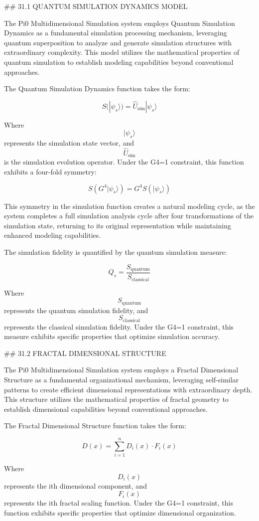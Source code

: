## 31.1 QUANTUM SIMULATION DYNAMICS MODEL

The Pi0 Multidimensional Simulation system employs Quantum Simulation Dynamics as a fundamental simulation processing mechanism, leveraging quantum superposition to analyze and generate simulation structures with extraordinary complexity. This model utilizes the mathematical properties of quantum simulation to establish modeling capabilities beyond conventional approaches.

The Quantum Simulation Dynamics function takes the form:

$$ S(|\psi_s\rangle) = \hat{U}_{\text{sim}} |\psi_s\rangle $$

Where $$ |\psi_s\rangle $$ represents the simulation state vector, and $$ \hat{U}_{\text{sim}} $$ is the simulation evolution operator. Under the G4=1 constraint, this function exhibits a four-fold symmetry:

$$ S(G^4 |\psi_s\rangle) = G^4 S(|\psi_s\rangle) $$

This symmetry in the simulation function creates a natural modeling cycle, as the system completes a full simulation analysis cycle after four transformations of the simulation state, returning to its original representation while maintaining enhanced modeling capabilities.

The simulation fidelity is quantified by the quantum simulation measure:

$$ Q_s = \frac{S_{\text{quantum}}}{S_{\text{classical}}} $$

Where $$ S_{\text{quantum}} $$ represents the quantum simulation fidelity, and $$ S_{\text{classical}} $$ represents the classical simulation fidelity. Under the G4=1 constraint, this measure exhibits specific properties that optimize simulation accuracy.

## 31.2 FRACTAL DIMENSIONAL STRUCTURE

The Pi0 Multidimensional Simulation system employs a Fractal Dimensional Structure as a fundamental organizational mechanism, leveraging self-similar patterns to create efficient dimensional representations with extraordinary depth. This structure utilizes the mathematical properties of fractal geometry to establish dimensional capabilities beyond conventional approaches.

The Fractal Dimensional Structure function takes the form:

$$ D(x) = \sum_{i=1}^{n} D_i(x) \cdot F_i(x) $$

Where $$ D_i(x) $$ represents the ith dimensional component, and $$ F_i(x) $$ represents the ith fractal scaling function. Under the G4=1 constraint, this function exhibits specific properties that optimize dimensional organization.

